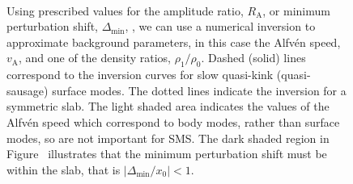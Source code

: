 \documentclass[namedreferences]{solarphysics}
\numberwithin{equation}{section}
\begin{document}
\begin{article}
\begin{figure}
\centering
{}
\\
\caption{Using prescribed values for the amplitude ratio, $R_\textrm{A}$, \protect{} or minimum perturbation shift, $\Delta_\textrm{min}$, \protect{}, we can use a numerical inversion to approximate background parameters, in this case the Alfv\'{e}n speed, $v_\textrm{A}$, and one of the density ratios, $\rho_1 / \rho_0$. Dashed (solid) lines correspond to the inversion curves for slow quasi-kink (quasi-sausage) surface modes. The dotted lines indicate the inversion for a symmetric slab. The light shaded area indicates the values of the Alfv\'{e}n speed which correspond to body modes, rather than surface modes, so are not important for SMS. The dark shaded region in Figure~\protect{} illustrates that the minimum perturbation shift must be within the slab, that is $|\Delta_\textrm{min} / x_0| < 1$.}
\label{fig: vA approx}
\end{figure}


\end{article}
\end{document}
